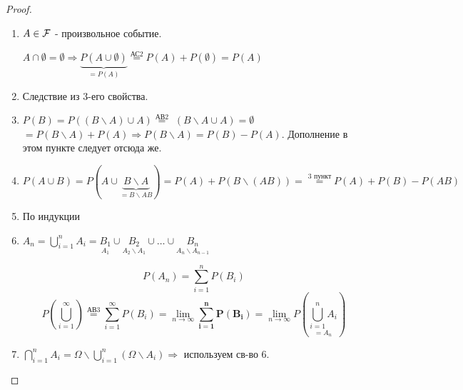\begin{proof}\leavevmode\vspace*{-\medskipamount}
	\begin{enumerate}
		\item $A \in {\mathcal F}$ - произвольное событие.
		
		$A \cap \emptyset = \emptyset \Rightarrow \underbrace{P(A \cup \emptyset)}_{= P(A)} \stackrel{\text{АС2}}{=} P(A) + P(\emptyset) = P(A)$
		
		\item Следствие из 3-его свойства.
		
		\item $P(B) = P((B \backslash A) \cup A) \stackrel{\text{АВ2}}{=} $
		$(B \backslash A \cup A)= \emptyset$
		$= P(B \backslash A) + P(A) \Rightarrow P(B \backslash A) = P(B) - P(A)$. Дополнение в этом пункте следует отсюда же.
		
		\item $P(A \cup B) = P(A \cup \underbrace{B \backslash A}_{= B \backslash AB}) = P(A) + P(B \backslash (AB)) = \stackrel{\text{3 пункт}}{=} P(A) + P(B) - P(AB)$
		
		\item По индукции
		
		\item $A_n = \bigcup_{i=1}^n A_i = \underset{A_1}{B_1} \cup \underset{A_2 \backslash A_1}{B_2} \cup \dots \cup \underset{A_n \backslash A_{n-1}}{B_n}$
		
		\[ P(A_n) = \sum_{i = 1}^{n} P(B_i) \]
		\[ P \left(\bigcup_{i=1}^{\infty} \right) \stackrel{\text{АВ3}}{=} \sum_{i=1}^{\infty} P(B_i) = \lim_{n \to \infty} \mathbf{\sum_{i=1}^{n} P(B_i)} = \lim_{n \to \infty} P \left(\underset{= A_n}{\bigcup_{i=1}^n A_i} \right) \]
		
		\item $\bigcap_{i=1}^n A_i = \Omega \backslash \bigcup_{i=1}^n (\Omega \backslash A_i) \Rightarrow$ используем св-во 6.
	\end{enumerate}
\end{proof}

